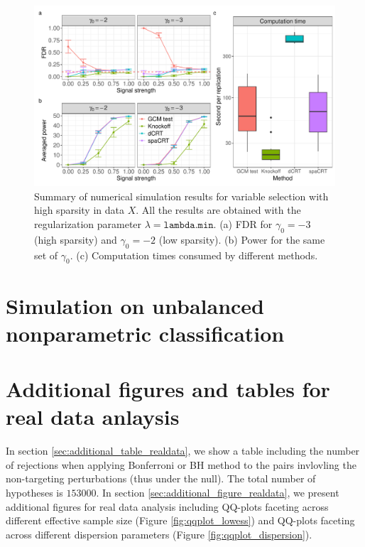 \documentclass[12pt]{article}
\theoremstyle{definition}
\begin{document}
\begin{figure}[!ht]
  \centering
  \includegraphics[width=1.0\textwidth]{figures-and-tables/simulation/HMM-variable-selection/HMM_simulation_skew_lambda.min.pdf}
  \caption{Summary of numerical simulation results for variable selection with high sparsity in data $X$. All the results are obtained with the regularization parameter $\lambda=\texttt{lambda.min}$. (a) FDR for $\gamma_0=-3$ (high sparsity) and $\gamma_0=-2$ (low sparsity). (b) Power for the same set of $\gamma_0$. (c) Computation times consumed by different methods. }
  \label{fig:simulation-summary-GWAS-skew-lambda-min}
\end{figure}

\clearpage

\section{Simulation on unbalanced nonparametric classification}\label{sec:nonparametric_RF_classification}



\newpage

\section{Additional figures and tables for real data anlaysis}

In section \ref{sec:additional_table_realdata}, we show a table including the number of rejections when applying Bonferroni or BH method to the pairs invlovling the non-targeting perturbations (thus under the null). The total number of hypotheses is $153000$. In section \ref{sec:additional_figure_realdata}, we present additional figures for real data analysis including QQ-plots faceting across different effective sample size (Figure \ref{fig:qqplot_lowess}) and QQ-plots faceting across different dispersion parameters (Figure \ref{fig:qqplot_dispersion}). 
\end{document}
